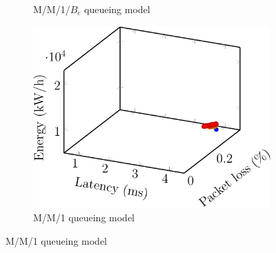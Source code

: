 \begin{figure}[t!]
\begin{subfigure}[b]{0.32\linewidth}
        \caption{M/M/1/$B_c$ queueing model}
    \end{subfigure}
    \begin{subfigure}[b]{0.32\linewidth}
        \includegraphics[width=\textwidth]{graphs/model/mm1-crop}
        \caption{M/M/1 queueing model}
    \end{subfigure}

    \vspace{1.5em}


\end{figure}
